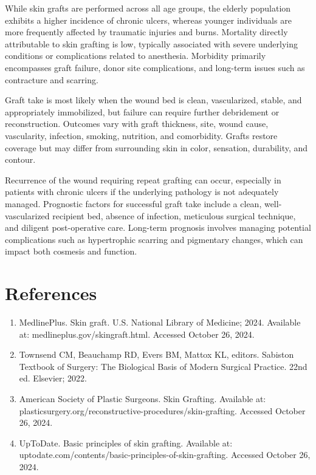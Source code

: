 While skin grafts are performed across all age groups, the elderly population exhibits a higher incidence of chronic ulcers, whereas younger individuals are more frequently affected by traumatic injuries and burns. Mortality directly attributable to skin grafting is low, typically associated with severe underlying conditions or complications related to anesthesia. Morbidity primarily encompasses graft failure, donor site complications, and long-term issues such as contracture and scarring.

Graft take is most likely when the wound bed is clean, vascularized, stable, and appropriately immobilized, but failure can require further debridement or reconstruction. Outcomes vary with graft thickness, site, wound cause, vascularity, infection, smoking, nutrition, and comorbidity. Grafts restore coverage but may differ from surrounding skin in color, sensation, durability, and contour.

Recurrence of the wound requiring repeat grafting can occur, especially in patients with chronic ulcers if the underlying pathology is not adequately managed. Prognostic factors for successful graft take include a clean, well-vascularized recipient bed, absence of infection, meticulous surgical technique, and diligent post-operative care. Long-term prognosis involves managing potential complications such as hypertrophic scarring and pigmentary changes, which can impact both cosmesis and function.

\section*{References}
\begin{enumerate}
  \item MedlinePlus. Skin graft. U.S. National Library of Medicine; 2024. Available at: medlineplus.gov/skingraft.html. Accessed October 26, 2024.
  
  \item Townsend CM, Beauchamp RD, Evers BM, Mattox KL, editors. Sabiston Textbook of Surgery: The Biological Basis of Modern Surgical Practice. 22nd ed. Elsevier; 2022.
  
  \item American Society of Plastic Surgeons. Skin Grafting. Available at: plasticsurgery.org/reconstructive-procedures/skin-grafting. Accessed October 26, 2024.
  
  \item UpToDate. Basic principles of skin grafting. Available at: uptodate.com/contents/basic-principles-of-skin-grafting. Accessed October 26, 2024.
\end{enumerate}

\clearpage
